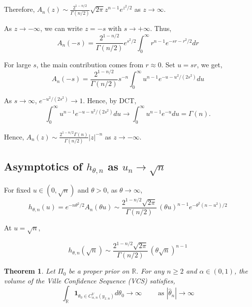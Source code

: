 \documentclass{article}%
\newtheorem{theorem}{Theorem}
\newcommand{\one}{\boldsymbol{1}}
\begin{document}
Therefore, $A_n(z) \sim \frac{2^{1-n/2}}{\Gamma(n/2)} \sqrt{2\pi} z^{n-1} e^{z^2/2}$ as $z \longrightarrow \infty$.

As $z\longrightarrow - \infty$, we can write $z = -s$ with $s \longrightarrow + \infty$. Thus,
\[
A_n (-s) = \frac{2^{1-n/2}}{\Gamma(n/2)} e^{s^2/2} \int_{0}^{\infty}  r^{n-1} e^{-sr -r^2/2} dr
\]

For large $s$, the main contribution comes from $r \approx 0$. Set $u = sr$, we get,
\[
A_n(-s) = \frac{2^{1-n/2}}{\Gamma(n/2)} s^{-n} \int_{0}^\infty u^{n-1} e^{-u - u^2/(2s^2)} du 
\]

As $s \longrightarrow \infty$, $e^{-u^2/(2s^2)} \longrightarrow 1$. Hence, by DCT,
\[
\int_{0}^\infty u^{n-1} e^{-u-u^2/(2s^2)} du \longrightarrow \int_{0}^\infty u^{n-1} e^{-u} du = \Gamma(n).
\]

Hence, $A_n(z) \sim \frac{2^{1-n/2}\Gamma(n)}{\Gamma(n/2)} |z|^{-n} $ as $z \longrightarrow -\infty$.

\subsection{Asymptotics of $h_{\theta, n}$ as $u_n \longrightarrow \sqrt{n}$}

For fixed $u \in (0, \sqrt{n})$ and $\theta >0$, as $\theta \longrightarrow \infty$,
\[
h_{\theta,n}(u)=e^{-n\theta^2/2}A_n(\theta u) \sim \frac{2^{1-n/2}\sqrt{2\pi}}{\Gamma(n/2)}\, (\theta u)^{n-1} e^{-\theta^2(n-u^2)/2}
\]

At $u = \sqrt{n}$,

\[
h_{\theta,n}(\sqrt{n}) \sim \frac{2^{1-n/2}\sqrt{2\pi}}{\Gamma(n/2)}\,(\theta\sqrt{n})^{n-1}
\]

\begin{theorem}\label{thm:cs_vol}
    Let $\Pi_0$ be a proper prior on $\mathbb{R}$. For any $n\geq 2$ and $\alpha \in (0,1)$, the volume of the Ville Confidence Sequence (VCS) satisfies,
    \[
    \int_\mathbb{R} \one_{\theta_0 \in C_{\alpha, n}^V (y_{1:n})} d\theta_0 \longrightarrow \infty  \qquad \text{ as } |\hat{\theta}_n| \longrightarrow \infty
    \]
\end{theorem}
\end{document}
